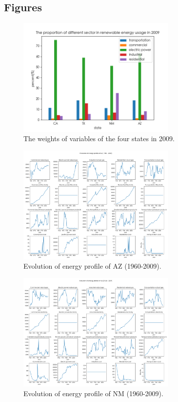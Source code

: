 \documentclass[a4paper,11pt]{article}
\begin{document}
\newpage%
\begin{appendices} 
    \pagestyle{empty}
    \section*{Figures}
\begin{figure}[h]%
    \centering
    \includegraphics[width=0.7\textwidth]{./Pic/1-3.png}
    \caption{The weights of variables of the four states in 2009.}
    \label{fig:part-2-AZ}  
\end{figure}
\begin{figure}[h]%
    \centering
    \includegraphics[width=0.7\textwidth]{./Pic/part-2-AZ.png}
    \caption{Evolution of energy profile of AZ (1960-2009).}
    \label{fig:part-2-AZ}  
\end{figure}

\begin{figure}[h]%
    \centering 
    \includegraphics[width=0.7\textwidth]{./Pic/part-2-NM.png}
    \caption{Evolution of energy profile of NM (1960-2009).}
    \label{fig:part-2-NM}  
\end{figure}


\end{appendices}
\end{document}
